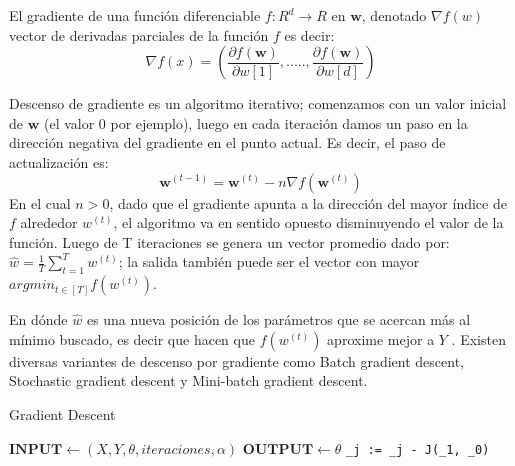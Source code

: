 El gradiente de una función diferenciable $ f: R^d \longrightarrow R $ en $\textbf{w}$, denotado $ \nabla f(w) $ vector de derivadas parciales de la función $f$ es decir:
\begin{equation}
\nabla f(x) = (\frac{\partial f(\textbf{w})}{\partial w[1]},....., \frac{\partial f(\textbf{w})}{\partial w[d]})
\end{equation}

Descenso de gradiente es un algoritmo iterativo; comenzamos con un valor inicial de $\textbf{w}$ (el valor 0 por ejemplo), luego en cada iteración damos un paso en la dirección negativa del gradiente en el punto actual. Es decir, el paso de actualización es:
\begin{equation}
\textbf{w}^{(t-1)} = \textbf{w}^{(t)} - n \nabla f(\textbf{w}^{(t)})
\end{equation}
En el cual $n > 0$, dado que el gradiente apunta a la dirección del mayor índice de $f$ alrededor $w^{(t)}$, el algoritmo va en sentido opuesto disminuyendo el valor de la función. Luego de T iteraciones se genera un vector promedio dado por: $ \hat{w} = \frac{1}{T} \sum_{t=1}^T w^{(t)}$; la salida también puede ser el vector con mayor  $ argmin_{t \in [T]} f(w^{(t)}) $.


En dónde $\hat{w}$ es una nueva posición de los parámetros que se acercan más al mínimo buscado, es decir que hacen que $f(w^{(t)})$ aproxime mejor a $Y$ . Existen diversas variantes de descenso por gradiente como Batch gradient descent, Stochastic gradient descent y Mini-batch gradient descent.


\begin{algorithm}
\caption{Gradient Descent}\label{euclid}
\begin{algorithmic}[1]

\State $\textbf{INPUT} \gets (X, Y, \theta,iteraciones, \alpha)$
\State $\textbf{OUTPUT} \gets \theta $
        \State \texttt{\theta_{j} := \theta_{j} - \alpha \frac{\partial}{\partial \theta} J(\theta_{1}, \theta_{0})}
        
\EndFor
\end{algorithmic}
\end{algorithm}



